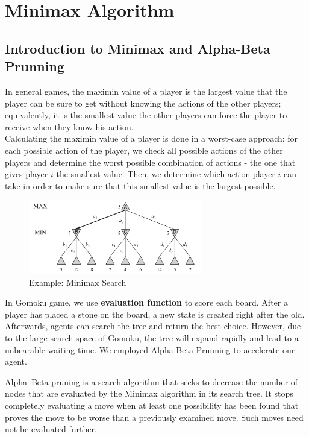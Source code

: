 \documentclass[12pt,a4paper]{article}
\begin{document}
\section{Minimax Algorithm}

\subsection{Introduction to Minimax and Alpha-Beta Prunning}

In general games, the maximin value of a player is the largest value that the player can be sure to get without knowing the actions of the other players; equivalently, it is the smallest value the other players can force the player to receive when they know his action.\\
Calculating the maximin value of a player is done in a worst-case approach: for each possible action of the player, we check all possible actions of the other players and determine the worst possible combination of actions - the one that gives player $i$ the smallest value. Then, we determine which action player $i$ can take in order to make sure that this smallest value is the largest possible.

\begin{figure}[!h]
\centering\includegraphics[width=3in]{3.png}
\caption{Example: Minimax Search}
\end{figure} 

In Gomoku game, we use \textbf{evaluation function} to score each board. After a player has placed a stone on the board, a new state is created right after the old. Afterwards, agents can search the tree and return the best choice. However, due to the large search space of Gomoku, the tree will expand rapidly and lead to a unbearable waiting time. We employed Alpha-Beta Prunning to accelerate our agent.

Alpha–Beta pruning is a search algorithm that seeks to decrease the number of nodes that are evaluated by the Minimax algorithm in its search tree. It stops completely evaluating a move when at least one possibility has been found that proves the move to be worse than a previously examined move. Such moves need not be evaluated further. 
\end{document}
